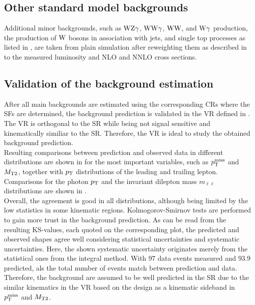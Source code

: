 \subsection{Other standard model backgrounds}
Additional minor backgrounds, such as $\mathrm{W}\mathrm{Z}\gamma$, $\mathrm{W}\mathrm{W}\gamma$, $\mathrm{W}\mathrm{W}$, and $\mathrm{W}\gamma$ production, the production of $\mathrm{W}$ bosons in association with jets, and single top processes as listed in , are taken from plain simulation after reweighting them as described in  to the measured luminosity and NLO and NNLO cross sections.

\FloatBarrier
\subsection{Validation of the background estimation}\label{sec:Validation}
After all main backgrounds are estimated using the corresponding CRs where the SFs are determined, the background prediction is validated in the VR defined in . The VR is orthogonal to the SR while being not signal sensitive and kinematically similiar to the SR. Therefore, the VR is ideal to study the obtained background prediction.\\
Resulting comparisons between prediction and observed data in different distributions are shown in  for the most important variables, such as $p_{\mathrm{T}}^\text{miss}$ and $M_{\mathrm{T2}}$, together with $p_{\mathrm{T}}$ distributions of the leading and trailing lepton. Comparisons for the photon $p_{\mathrm{T}}$ and the invariant dilepton mass $m_{\ell\ell}$ distributions are shown in .\\
Overall, the agreement is good in all distributions, although being limited by the low statistics in some kinematic regions. Kolmogorov-Smirnov tests are performed to gain more trust in the background prediction. As can be read from the resulting KS-values, each quoted on the corresponding plot, the predicted and observed shapes agree well considering statistical uncertainties and systematic uncertainties. Here, the shown systematic uncertainty originates merely from the statistical ones from the integral method. With $97$ data events measured and $93.9$ predicted, als the total number of events match between prediction and data.\\
Therefore, the background are assumed to be well predicted in the SR due to the similar kinematics in the VR based on the design as a kinematic sideband in $p_{\mathrm{T}}^\text{miss}$ and $M_{\mathrm{T2}}$.
